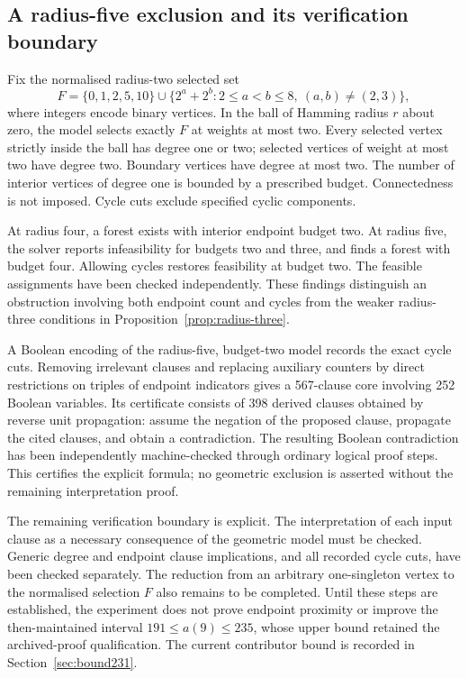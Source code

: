 \documentclass[11pt,a4paper]{article}
\theoremstyle{definition}
\theoremstyle{remark}
\begin{document}
\subsection{A radius-five exclusion and its verification boundary}
Fix the normalised radius-two selected set
\[
F=\{0,1,2,5,10\}\cup
\{2^a+2^b:2\le a<b\le8,\ (a,b)\ne(2,3)\},
\]
where integers encode binary vertices. In the ball of Hamming radius $r$ about zero, the model selects exactly $F$ at weights at most two. Every selected vertex strictly inside the ball has degree one or two; selected vertices of weight at most two have degree two. Boundary vertices have degree at most two. The number of interior vertices of degree one is bounded by a prescribed budget. Connectedness is not imposed. Cycle cuts exclude specified cyclic components.

At radius four, a forest exists with interior endpoint budget two. At radius five, the solver reports infeasibility for budgets two and three, and finds a forest with budget four. Allowing cycles restores feasibility at budget two. The feasible assignments have been checked independently. These findings distinguish an obstruction involving both endpoint count and cycles from the weaker radius-three conditions in Proposition~\ref{prop:radius-three}.

A Boolean encoding of the radius-five, budget-two model records the exact cycle cuts. Removing irrelevant clauses and replacing auxiliary counters by direct restrictions on triples of endpoint indicators gives a 567-clause core involving 252 Boolean variables. Its certificate consists of 398 derived clauses obtained by reverse unit propagation: assume the negation of the proposed clause, propagate the cited clauses, and obtain a contradiction. The resulting Boolean contradiction has been independently machine-checked through ordinary logical proof steps. This certifies the explicit formula; no geometric exclusion is asserted without the remaining interpretation proof.

The remaining verification boundary is explicit. The interpretation of each input clause as a necessary consequence of the geometric model must be checked. Generic degree and endpoint clause implications, and all recorded cycle cuts, have been checked separately. The reduction from an arbitrary one-singleton vertex to the normalised selection $F$ also remains to be completed. Until these steps are established, the experiment does not prove endpoint proximity or improve the then-maintained interval $191\le a(9)\le235$, whose upper bound retained the archived-proof qualification. The current contributor bound is recorded in Section~\ref{sec:bound231}.
\end{document}
